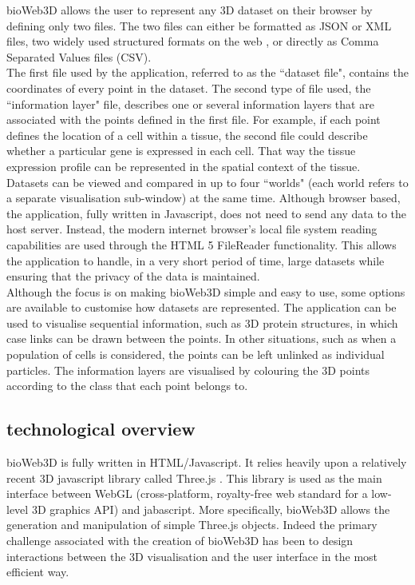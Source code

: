 \documentclass[10pt]{bmc_article}
\newenvironment{bmcformat}{\baselineskip20pt\sloppy\setboolean{publ}{false}}{\baselineskip20pt\sloppy}
\begin{document}
\begin{bmcformat}
bioWeb3D allows the user to represent any 3D dataset on their browser by defining only two files. The two files can either be formatted as JSON or XML files, two widely used structured formats on the web \cite{Wilde07} \cite{xml}, or directly as Comma Separated Values files (CSV).\\
The first file used by the application, referred to as the ``dataset file", contains the coordinates of every point in the dataset. The second type of file used, the ``information layer" file, describes one or several information layers that are associated with the points defined in the first file. For example, if each point defines the location of a cell within a tissue, the second file could describe whether a particular gene is expressed in each cell. That way the tissue expression profile can be represented in the spatial context of the tissue.\\
Datasets can be viewed and compared in up to four ``worlds" (each world refers to a separate visualisation sub-window) at the same time. Although browser based, the application, fully written in Javascript, does not need to send any data to the host server. Instead, the modern internet browser's local file system reading capabilities are used through the HTML 5 FileReader functionality. This allows the application to handle, in a very short period of time, large datasets while ensuring that the privacy of the data is maintained.\\
Although the focus is on making bioWeb3D simple and easy to use, some options are available to customise how datasets are represented. The application can be used to visualise sequential information, such as 3D protein structures, in which case links can be drawn between the points. In other situations, such as when a population of cells is considered, the points can be left unlinked as individual particles. The information layers are visualised by colouring the 3D points according to the class that each point belongs to.
\subsection{technological overview}
bioWeb3D is fully written in HTML/Javascript. It relies heavily upon a relatively recent 3D javascript library called Three.js \cite{three}. This library is used as the main interface between WebGL (cross-platform, royalty-free web standard for a low-level 3D graphics API) \cite{webgl} and jabascript. More specifically, bioWeb3D allows the generation and manipulation of simple Three.js objects. Indeed the primary challenge associated with the creation of bioWeb3D has been to design interactions between the 3D visualisation and the user interface in the most efficient way.\\

\end{bmcformat}
\end{document}
